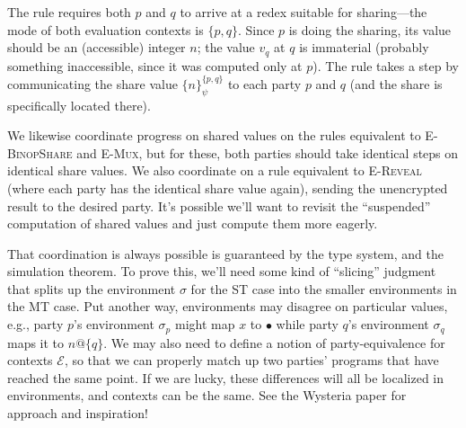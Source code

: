 \documentclass[10pt]{article}
\makeatletter
\newcommand{\rulelab}[1]{{\small \textsc{#1}}}
\newcommand{\kw}[1]{\ensuremath{\mathtt{#1}}}
\newcommand{\ebinop}[2]{\ensuremath{{#1}~\oplus~{#2}}}
\newcommand{\ereveal}[3]{\ensuremath{\kw{reveal}^{#1}~{#2}~{#3}}}
\newcommand{\eshare}[4]{\ensuremath{\kw{share}^{#2}_{#1}~{#3}~{#4}}}
\newcommand{\vshare}[3]{\ensuremath{\{{#3}\}^{#1}_{#2}}}
\newcommand{\vloc}[2]{\ensuremath{{#1}\kw{@}{#2}}}
\newcommand{\vcrash}{\ensuremath{\bullet}}
\newcommand{\env}{\ensuremath{\sigma}}
\newcommand{\ctxt}{\ensuremath{\mathcal{E}}}
\makeatother
\begin{document}
The rule requires both $p$ and $q$ to arrive at a redex suitable
for sharing---the mode of both evaluation contexts is
$\{p,q\}$. Since $p$ is doing the sharing, its value should be an
(accessible) integer $n$; the value $v_q$ at $q$ is immaterial
(probably something inaccessible, since it was computed only at $p$).
The rule takes a step by communicating the share
value $\vshare{\{p,q\}}{\psi}{n}$ to each party $p$ and $q$ (and the
share is specifically located there).

We likewise coordinate progress on shared values on the rules
equivalent to \rulelab{E-BinopShare} and \rulelab{E-Mux}, but for
these, both parties should take identical steps on identical share
values. We also coordinate on a rule equivalent to \rulelab{E-Reveal}
(where each party has the identical share value again), sending the
unencrypted result to the desired party. It's possible we'll want to
revisit the ``suspended'' computation of shared values and just
compute them more eagerly.

That coordination is always possible is guaranteed by the type system,
and the simulation theorem. To prove this, we'll need some kind of
``slicing'' judgment that splits up the environment $\env$ for the ST
case into the smaller environments in the MT case. Put another way,
environments may disagree on particular values, e.g., party $p$'s
environment $\env_p$ might map $x$ to $\vcrash$ while party $q$'s
environment $\env_q$ maps it to $\vloc{n}{\{q\}}$. We may also need to
define a notion of party-equivalence for contexts $\ctxt$, so that we
can properly match up two parties' programs that have reached the same
point. If we are lucky, these differences will all be localized in
environments, and contexts can be the same. See the Wysteria paper for
approach and inspiration!

\end{document}
